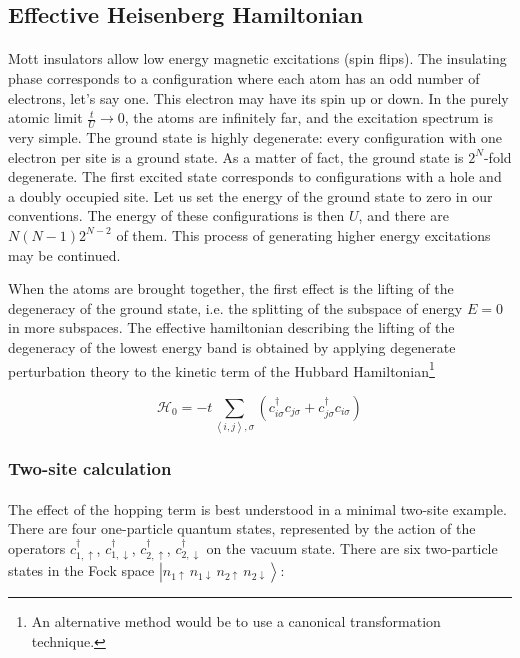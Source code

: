 \subsection{Effective Heisenberg Hamiltonian}\paragraph{}

Mott insulators allow low energy magnetic excitations (spin flips). The insulating phase corresponds to a configuration where each atom has an odd number of electrons, let's say one. This electron may have its spin up or down. In the purely atomic limit $\frac{t}{U} \rightarrow 0$, the atoms are infinitely far, and the excitation spectrum is very simple. The ground state is highly degenerate: every configuration with one electron per site is a ground state. As a matter of fact, the ground state is $2^N$-fold degenerate. The first excited state corresponds to configurations with a hole and a doubly occupied site. Let us set the energy of the ground state to zero in our conventions.  The energy of these configurations is then $U$, and there are $N(N-1)2^{N-2}$ of them. This process of generating higher energy excitations may be continued.

When the atoms are brought together, the first effect is the lifting of the degeneracy of the ground state, i.e. the splitting of the subspace of energy $E = 0$ in more subspaces. The effective hamiltonian describing the lifting of the degeneracy of the lowest energy band is obtained by applying degenerate perturbation theory \cite{Mila2007} to the kinetic term of the Hubbard Hamiltonian\footnote{An alternative method would be to use a canonical transformation technique.}

\begin{equation}
\mathcal{H}_0 = - t \sum_{\left\langle i, j \right\rangle, \sigma} ( c_{i\sigma}^\dagger c_{j\sigma} + c_{j\sigma}^\dagger c_{i\sigma} ) 
\end{equation}

\subsubsection{Two-site calculation}\paragraph{}

The effect of the hopping term is best understood in a minimal two-site example. There are four one-particle quantum states, represented by the action of the operators $c_{1,\uparrow}^\dagger$, $c_{1,\downarrow}^\dagger$, $c_{2,\uparrow}^\dagger$, $c_{2,\downarrow}^\dagger$ on the vacuum state. There are six two-particle states in the Fock space $\left| n_{1\uparrow} \,  n_{1\downarrow} \,  n_{2\uparrow} \, n_{2\downarrow} \right\rangle$:

